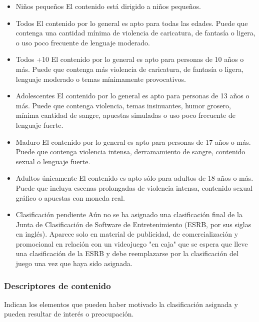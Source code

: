 \documentclass{article}
\begin{document}
			\begin{itemize}
				
			
			\item Niños pequeños
			El contenido está dirigido a niños pequeños.
			
			\item Todos
			El contenido por lo general es apto para todas las edades. Puede que contenga una cantidad mínima de violencia de caricatura, de fantasía o ligera, o uso poco frecuente de lenguaje moderado.
			
			\item Todos +10
			El contenido por lo general es apto para personas de 10 años o más. Puede que contenga más violencia de caricatura, de fantasía o ligera, lenguaje moderado o temas mínimamente provocativos.
			
			\item Adolescentes
			El contenido por lo general es apto para personas de 13 años o más. Puede que contenga violencia, temas insinuantes, humor grosero, mínima cantidad de sangre, apuestas simuladas o uso poco frecuente de lenguaje fuerte.
			
			\item Maduro
			El contenido por lo general es apto para personas de 17 años o más. Puede que contenga violencia intensa, derramamiento de sangre, contenido sexual o lenguaje fuerte.
			
			\item Adultos únicamente
			El contenido es apto sólo para adultos de 18 años o más. Puede que incluya escenas prolongadas de violencia intensa, contenido sexual gráfico o apuestas con moneda real.
			
			\item Clasificación pendiente
			Aún no se ha asignado una clasificación final de la Junta de Clasificación de Software de Entretenimiento (ESRB, por sus siglas en inglés). Aparece solo en material de publicidad, de comercialización y promocional en relación con un videojuego "en caja" que se espera que lleve una clasificación de la ESRB y debe reemplazarse por la clasificación del juego una vez que haya sido asignada.
			
		\end{itemize}
			
			\subsubsection{Descriptores de contenido} 
			Indican los elementos que pueden haber motivado la clasificación asignada y pueden resultar de interés o preocupación.
			
\end{document}
